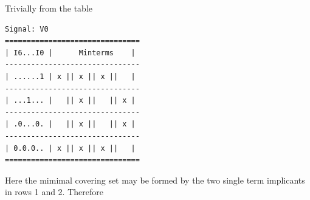 \documentclass{article}
\begin{document}
\begin{enumerate}
            Trivially from the table 

            \begin{scriptsize}
                \begin{verbatim}
Signal: V0
===============================
| I6...I0 |      Minterms    |
-------------------------------
| ......1 | x || x || x ||   |
-------------------------------
| ...1... |   || x ||   || x |
-------------------------------
| .0...0. |   || x ||   || x |
-------------------------------
| 0.0.0.. | x || x || x ||   |
===============================
                \end{verbatim}
            \end{scriptsize}

            Here the mimimal covering set may be formed by the two single term
            implicants in rows 1 and 2. Therefore 


\end{enumerate}
\end{document}
